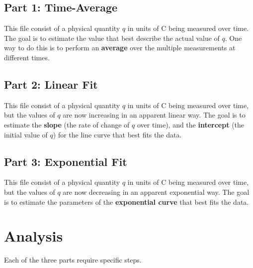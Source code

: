\subsection{Part 1: Time-Average}
%
This file consist of a physical quantity $q$ in units of C being measured over time. The goal is to estimate the value that best describe the actual value of $q$. One way to do this is to perform an \textbf{average} over the multiple measurements at different times.
%
\subsection{Part 2: Linear Fit}
%
This file consist of a physical quantity $q$ in units of C being measured over time, but the values of $q$ are now increasing in an apparent linear way. The goal is to estimate the \textbf{slope} (the rate of change of $q$ over time), and the \textbf{intercept} (the initial value of $q$) for the line curve that best fits the data.
%
\subsection{Part 3: Exponential Fit}
%
This file consist of a physical quantity $q$ in units of C being measured over time, but the values of $q$ are now decreasing in an apparent exponential way. The goal is to estimate the parameters of the \textbf{exponential curve} that best fits the data.
%
\section{Analysis}
%
Each of the three parts require specific steps.
%
